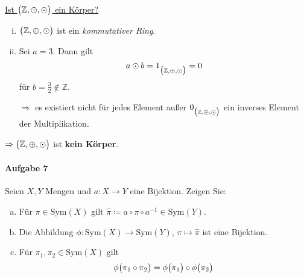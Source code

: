 \documentclass{scrreprt}
\newcommand\Sym{\text{Sym}}
\begin{document}
\underline{Ist $\qty\big(\mathbb{Z}, \oplus, \odot)$ ein Körper?}
\begin{enumerate}[(i)]
\item $\qty\big(\mathbb{Z}, \oplus, \odot)$ ist ein \emph{kommutativer Ring}.
\item Sei $a = 3$.
  Dann gilt
  \[
    a \odot b = 1_{\qty\big(\mathbb{Z}, \oplus, \odot)} = 0
  \]
  für $b = \frac{3}{2} \notin \mathbb{Z}$.

  $\Rightarrow$ es existiert nicht für jedes Element außer
  $0_{\qty\big(\mathbb{Z}, \oplus, \odot)}$ ein inverses Element
  der Multiplikation.
\end{enumerate}
$\Rightarrow \qty\big(\mathbb{Z}, \oplus, \odot)$ ist \textbf{kein Körper}.

\newpage
\paragraph{Aufgabe 7} Seien $X, Y$ Mengen und $a \colon X \to Y$ eine Bijektion.
Zeigen Sie:
\begin{enumerate}[(a)]
\item Für $\pi \in \Sym(X)$ gilt
  $\hat\pi \coloneqq a \circ \pi \circ a^{-1} \in \Sym(Y)$.

\item Die Abbildung $\phi \colon \Sym(X) \to \Sym(Y)$,
  $\pi \mapsto \hat\pi$ ist eine Bijektion.

\item Für $\pi_1, \pi_2 \in \Sym(X)$ gilt
  \[
    \phi\qty\big(\pi_1 \circ \pi_2)
    = \phi\qty\big(\pi_1) \circ \phi\qty\big(\pi_2)
  \]
\end{enumerate}
\end{document}
